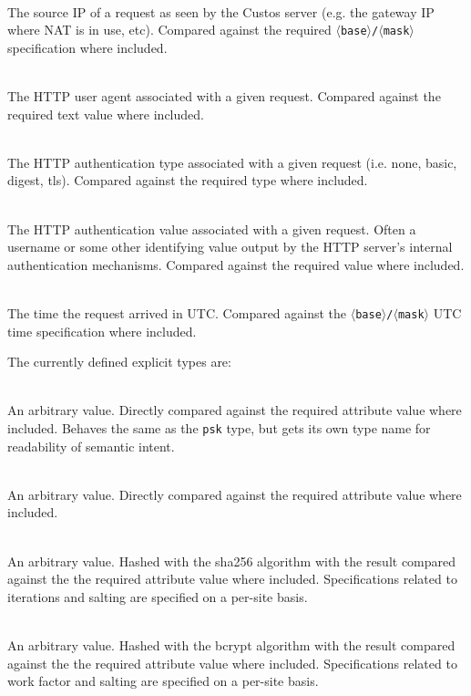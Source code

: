 \begin{packed_desc}
\item[\texttt{ip\_src}] \hfill \\ The source IP of a request as seen
  by the Custos server (e.g. the gateway IP where NAT is in use,
  etc). Compared against the required
  \texttt{$\langle$base$\rangle$/$\langle$mask$\rangle$} specification
  where included.
\item[\texttt{user\_agent}] \hfill \\ The HTTP user agent
  associated with a given request. Compared against the required text
  value where included.
\item[\texttt{auth\_type}] \hfill \\ The HTTP authentication type
  associated with a given request (i.e. none, basic, digest,
  tls). Compared against the required type where included.
\item[\texttt{auth\_value}] \hfill \\ The HTTP authentication value
  associated with a given request. Often a username or some other
  identifying value output by the HTTP server's internal
  authentication mechanisms. Compared against the required value where
  included.
\item[\texttt{time\_utc}] \hfill \\ The time the request arrived in
  UTC. Compared against the
  \texttt{$\langle$base$\rangle$/$\langle$mask$\rangle$} UTC time
  specification where included.
\end{packed_desc}

\noindent
The currently defined explicit types are:

\begin{packed_desc}
\item[\texttt{user\_id}] \hfill \\ An arbitrary value. Directly
  compared against the required attribute value where
  included. Behaves the same as the \texttt{psk} type, but gets its
  own type name for readability of semantic intent.
\item[\texttt{psk}] \hfill \\ An arbitrary value. Directly
  compared against the required attribute value where included.
\item[\texttt{psk\_sha256}] \hfill \\ An arbitrary value. Hashed with
  the sha256 algorithm with the result compared against the the
  required attribute value where included. Specifications related to
  iterations and salting are specified on a per-site basis.
\item[\texttt{psk\_bcrypt}] \hfill \\ An arbitrary value. Hashed with
  the bcrypt algorithm with the result compared against the the
  required attribute value where included. Specifications related to
  work factor and salting are specified on a per-site basis.
\end{packed_desc}

